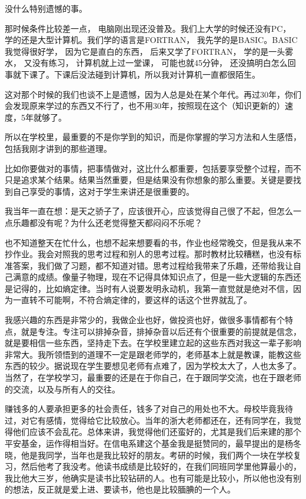 
没什么特别遗憾的事。

那时候条件比较差一点， 电脑刚出现还没普及。我们上大学的时候还没有PC， 学的还是大型计算机。我们学的语言是FORTRAN， 我先学的是BASIC。BASIC我觉得很好学， 因为它是直白的东西， 后来又学了FORTRAN， 学的是一头雾水， 又没有练习， 计算机就上过一堂课， 可能也就45分钟， 还没搞明白怎么回事就下课了。下课后没法碰到计算机，所以我对计算机一直都很陌生。

这对那个时候的我们也谈不上是遗憾，因为人总是处在某个年代。再过30年，你们会发现原来学过的东西又不行了，也不用30年，按照现在这个（知识更新的）速度，5年就够了。

所以在学校里，最重要的不是你学到的知识，而是你掌握的学习方法和人生感悟，包括我刚才讲到的那些道理。

比如你要做对的事情，把事情做对，这比什么都重要，包括要享受整个过程，而不只是追求某个结果。结果当然重要，但是结果没有你想象的那么重要。关键是要找到自己享受的事情，这对于学生来讲还是很重要的。

我当年一直在想：是天之骄子了，应该很开心，应该觉得自己很了不起，但怎么一点乐趣都没有呢？为什么还老觉得整天都闷闷不乐呢？

也不知道整天在忙什么，也想不起来想要看的书，作业也经常晚交，但是我从来不抄作业。我会对照我的思考过程和别人的思考过程。那时教材比较糟糕，也没有标准答案，我们做了习题，都不知道对错。思考过程给我带来了乐趣，还带给我让自己满意的成绩。像量子物理，现在不记得具体知识点了，但是一些大逻辑的东西还是记得的，比如熵定律。当时有人说要发明永动机，我第一直觉就是绝对不信，因为一直转不可能啊，不符合熵定律的，要这样的话这个世界就乱了。

我感兴趣的东西是非常少的，我做企业也好，做投资也好，做很多事情都有个特点，就是专注。专注可以排掉杂音，排掉杂音以后还有个很重要的前提就是信念，就是要相信一些东西，坚持走下去。在学校里建立起的这些东西对我这一辈子影响非常大。我所领悟到的道理不一定是跟老师学的，老师基本上就是教课，能教这些东西的较少。据说现在学生要想见老师有点难了，因为学校太大了，人也太多了。当然了，在学校学习，最重要的还是在于你自己，在于跟同学交流，也在于跟老师的交流，以及与所有人的交往。


赚钱多的人要承担更多的社会责任，钱多了对自己的用处也不大。母校毕竟我待过，对它有感情，觉得给它比较放心。当年的浙大老师都还在，还有同学在，我觉得他们应该不会乱花。总体来讲，我觉得他们还蛮好的，尤其是我们后来建的那个平安基金，运作得相当好。在信电系建这个基金我是挺赞同的，最早提出的是杨冬晓，他是我同学，当年也是我比较好的朋友。考研的时候，我们两个一块在学校复习，然后他考了我没考。他读书成绩是比较好的，在我们同班同学里他算最小的，我比他大三岁，他确实是读书比较钻研的人。也有可能是比较小，所以他也没有别的想法，反正就是爱上进、要读书，他也是比较腼腆的一个人。

